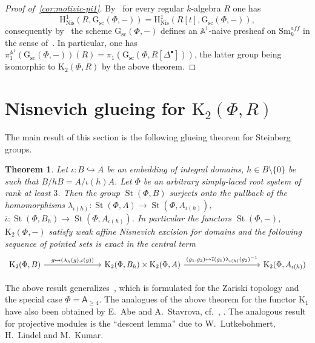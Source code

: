 \documentclass[oneside, 11pt]{amsart} \pdfoutput=1
\newcommand{\K}{{\mathrm{K}}}
\newcommand{\St}{\mathop{\mathrm{St}}\nolimits}
\newcommand{\Gsc}{\mathrm{G}_\mathrm{sc}}
\numberwithin{equation}{section}
\newtheorem{theorem}[lemma]{Theorem}
\theoremstyle{definition}
\newcommand{\rA}{\mathsf{A}}
\begin{document}
\begin{proof}[Proof of~\cref{cor:motivic-pi1}] 
 By~\cite[Corollary~5.4]{Sta20} for every regular $k$-algebra $R$ one has \[\mathrm H^1_\mathrm{Nis}(R, \Gsc(\Phi, -)) = \mathrm H^1_\mathrm{Nis}(R[t], \Gsc(\Phi, -)),\] consequently by~\cite[Theorem~2.4.2]{AHW18} the scheme $\Gsc(\Phi, -)$ defines an $\mathbb{A}^1$-naive presheaf on $\mathrm{Sm}_{k}^{aff}$ in the sense of~\cite[Definition~2.1.1]{AHW18}.
 In particular, one has $\pi_1^{\mathbb{A}^1}(\Gsc(\Phi, -))(R) = \pi_1(\Gsc(\Phi, R[\Delta^\bullet]))$, the latter group being isomorphic to $\K_2(\Phi, R)$ by the above theorem.
\end{proof}

\section{Nisnevich glueing for \texorpdfstring{$\K_2(\Phi, R)$}{K2(Ф,R)}} \label{sec:patching}
The main result of this section is the following glueing theorem for Steinberg groups.
\begin{theorem}\label{glueing}
Let $\iota\colon B \hookrightarrow A$ be an embedding of integral domains, $h\in B \setminus \{0\}$ be such that $B / hB = A / \iota(h)A$. Let $\Phi$ be an arbitrary simply-laced root system of rank at least $3$.
Then the group $\St(\Phi, B)$ surjects onto the pullback of the homomorphisms 
$\lambda_{\iota(h)}\colon \St(\Phi, A) \to \St(\Phi, A_{\iota(h)})$, $\overline{\iota}\colon\St(\Phi, B_h) \to \St(\Phi, A_{\iota(h)})$. In particular the functors $\St(\Phi, -)$, $\K_2(\Phi, -)$ satisfy weak affine Nisnevich excision for domains and the following sequence of pointed sets is exact in the central term
\begin{equation} \begin{tikzcd} \K_2(\Phi, B) \ar{rrr}{g \mapsto (\lambda_h(g), \iota(g))} & &  & \K_2(\Phi, B_h) \times \K_2(\Phi, A) \ar{rrrr}{(g_1,g_2) \mapsto \overline{\iota}(g_1) \lambda_{\iota(h)}(g_2)^{-1}} & & & & \K_2(\Phi, A_{\iota(h)}) \end{tikzcd} \end{equation}
\end{theorem}
The above result generalizes~\cite[Proposition~1.4]{Tu83}, which is formulated for the Zariski topology and the special case $\Phi=\rA_{\geq 4}$.
The analogues of the above theorem for the functor $\K_1$ have also been obtained by E.~Abe and A.~Stavrova, cf.~\cite[Lemma~3.7]{Abe83}, \cite[Lemma~3.4]{Sta14}.
The analogous result for projective modules is the ``descent lemma'' \cite[Lemma~4.7]{Bh99} due to W.~Lutkebohmert, H.~Lindel and M.~Kumar. 
\end{document}
